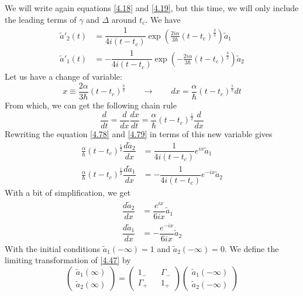 \documentclass[12pt,a4paper]{article}
\begin{document}
	We will write again equations \eqref{4.18} and \eqref{4.19}, but this time, we will only include the leading terms of $\gamma$ and $\Delta$ around $t_{c}$. We have
	\begin{align}
		\tilde{a}'_{2}(t) &= \dfrac{1}{4i \left( t - t_{c} \right)} \exp \left( \frac{2i\alpha}{3\hbar} \left( t - t_{c} \right)^{\frac{3}{2}} \right) \tilde{a}_{1} \label{4.78} \\[5pt]
		\tilde{a}'_{1}(t) &= -\dfrac{1}{4i \left( t - t_{c} \right)} \exp \left( -\frac{2i\alpha}{3\hbar} \left( t - t_{c} \right)^{\frac{3}{2}} \right) \tilde{a}_{2} \label{4.79}
	\end{align}
	Let us have a change of variable:
	\begin{equation}
		x \equiv \frac{2\alpha}{3\hbar} \left( t - t_{c} \right)^{\frac{3}{2}} \qquad \rightarrow \qquad dx = \frac{\alpha}{\hbar} \left( t - t_{c} \right)^{\frac{1}{2}} dt \label{4.80}
	\end{equation}
	From which, we can get the following chain rule
	\begin{equation}
		\dfrac{d}{dt} = \dfrac{d}{dx} \dfrac{dx}{dt} = \frac{\alpha}{\hbar} \left( t - t_{c} \right)^{\frac{1}{2}} \dfrac{d}{dx}
	\end{equation}
	Rewriting the equation \eqref{4.78} and \eqref{4.79} in terms of this new variable gives
	\begin{align}
		\frac{\alpha}{\hbar} \left( t - t_{c} \right)^{\frac{1}{2}} \dfrac{d\tilde{a}_{2}}{dx} &= \dfrac{1}{4i \left( t - t_{c} \right)} e^{ix} \tilde{a}_{1} \label{4.82} \\[5pt]
		\frac{\alpha}{\hbar} \left( t - t_{c} \right)^{\frac{1}{2}} \dfrac{d\tilde{a}_{1}}{dx} &= -\dfrac{1}{4i \left( t - t_{c} \right)} e^{-ix} \tilde{a}_{2} \label{4.83}
	\end{align}
	With a bit of simplification, we get
	\begin{align}
		\dfrac{d\tilde{a}_{2}}{dx} &= \dfrac{e^{ix}}{6ix} \tilde{a}_{1} \label{4.84} \\[5pt]
		\dfrac{d\tilde{a}_{1}}{dx} &= -\dfrac{e^{-ix}}{6ix} \tilde{a}_{2} \label{4.85}
	\end{align}
	With the initial conditions $\tilde{a}_{1}(-\infty) = 1$ and $\tilde{a}_{2}(-\infty) = 0$.
	We define the limiting transformation of \eqref{4.47} by
	\begin{equation}
		\begin{pmatrix}
			\tilde{a}_{1}(\infty) \\[5pt]
			\tilde{a}_{2}(\infty)
		\end{pmatrix}
		=
		\begin{pmatrix}
			1_{-} && \Gamma_{-} \\[5pt]
			\Gamma_{+} && 1_{+}	 
		\end{pmatrix}
		\begin{pmatrix}
			\tilde{a}_{1}(-\infty) \\[5pt]
			\tilde{a}_{2}(-\infty)
		\end{pmatrix} \label{4.86}
	\end{equation}
\end{document}
